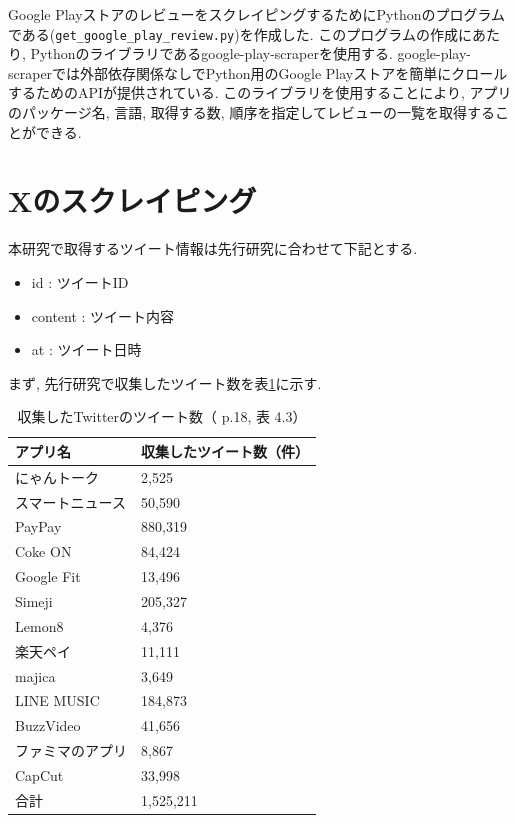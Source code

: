Google PlayストアのレビューをスクレイピングするためにPythonのプログラムである(\verb|get_google_play_review.py|)を作成した. このプログラムの作成にあたり, Pythonのライブラリであるgoogle-play-scraperを使用する. google-play-scraperでは外部依存関係なしでPython用のGoogle Playストアを簡単にクロールするためのAPIが提供されている\cite{google-play-scraper}. 
このライブラリを使用することにより, アプリのパッケージ名, 言語, 取得する数, 順序を指定してレビューの一覧を取得することができる. 


\section{Xのスクレイピング}
本研究で取得するツイート情報は先行研究に合わせて下記とする. 
\begin{itemize}
 \item id : ツイートID
 \item content : ツイート内容
 \item at : ツイート日時
\end{itemize}

まず, 先行研究で収集したツイート数を表\ref{tb:rawtweetnum}に示す. 

\begin{table}[htbp]
  \caption{収集したTwitterのツイート数（\cite{kawatsura} p.18, 表 4.3）}
  \label{tb:rawtweetnum}
  \begin{center}
  \begin{tabular}{l|l}
    \hline
    アプリ名&収集したツイート数（件）\\\hline\hline
    にゃんトーク&2,525\\\hline
    スマートニュース&50,590\\\hline
    PayPay&880,319\\\hline
    Coke ON&84,424\\\hline
    Google Fit&13,496\\\hline
    Simeji&205,327\\\hline
    Lemon8&4,376\\\hline
    楽天ペイ&11,111\\\hline
    majica&3,649\\\hline
    LINE MUSIC&184,873\\\hline
    BuzzVideo&41,656\\\hline
    ファミマのアプリ&8,867\\\hline
    CapCut&33,998\\\hline\hline
    合計&1,525,211
  \end{tabular}\end{center}
\end{table}

